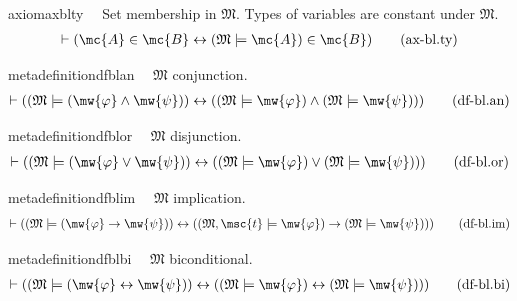 \begin{restatable}{axiom}{axblty}~~ Set membership  in $\mathfrak{M}$.
Types of variables are constant under $\mathfrak{M}$.
\begin{align}
\vdash ( \mc{A} \in \mc{B} \leftrightarrow ( \mathfrak{M} \models \mc{A} ) \in
    \mc{B} )\label{eq:ax-bl.ty}\tag{ax-bl.ty}
\end{align}
\end{restatable}

\begin{restatable}{metadefinition}{dfblan}~~ $\mathfrak{M}$ conjunction.
\begin{align}
\vdash ( ( \mathfrak{M} \models ( \mw{\varphi} \wedge \mw{\psi} ) )
    \leftrightarrow ( ( \mathfrak{M} \models \mw{\varphi} ) \wedge (
    \mathfrak{M} \models \mw{\psi} ) ) )\label{eq:df-bl.an}\tag{df-bl.an}
\end{align}
\end{restatable}

\begin{restatable}{metadefinition}{dfblor}~~ $\mathfrak{M}$ disjunction.
\begin{align}
\vdash ( ( \mathfrak{M} \models ( \mw{\varphi} \vee \mw{\psi} ) )
    \leftrightarrow ( ( \mathfrak{M} \models \mw{\varphi} ) \vee ( \mathfrak{M}
    \models \mw{\psi} ) ) )\label{eq:df-bl.or}\tag{df-bl.or}
\end{align}
\end{restatable}

\begin{restatable}{metadefinition}{dfblim}~~ $\mathfrak{M}$ implication.
\begin{align}
\vdash ( ( \mathfrak{M} \models ( \mw{\varphi} \rightarrow \mw{\psi} ) )
    \leftrightarrow ( ( \mathfrak{M} , \msc{t} \models \mw{\varphi} )
    \rightarrow ( \mathfrak{M} \models \mw{\psi} ) )
    )\label{eq:df-bl.im}\tag{df-bl.im}
\end{align}
\end{restatable}

\begin{restatable}{metadefinition}{dfblbi}~~ $\mathfrak{M}$ biconditional.
\begin{align}
\vdash ( ( \mathfrak{M} \models ( \mw{\varphi} \leftrightarrow \mw{\psi} ) )
    \leftrightarrow ( ( \mathfrak{M} \models \mw{\varphi} ) \leftrightarrow (
    \mathfrak{M} \models \mw{\psi} ) ) )\label{eq:df-bl.bi}\tag{df-bl.bi}
\end{align}
\end{restatable}

